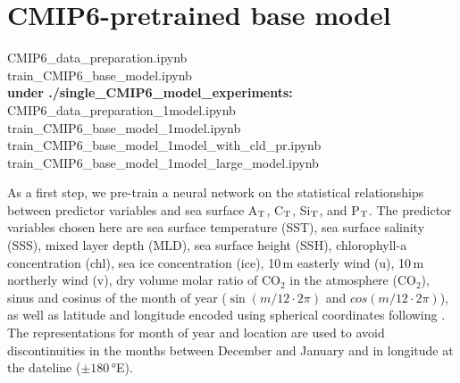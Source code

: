 \documentclass{article}
\begin{document}
	\section{CMIP6-pretrained base model} \label{sect:cmip6-pretraining}
	\begin{tcolorbox}[colback=gray!5!white, colframe=black!75!white, 
		fonttitle=\bfseries, title=Jupyter Notebooks, 
		rounded corners, width=\textwidth]
		CMIP6\_data\_preparation.ipynb \\
		train\_CMIP6\_base\_model.ipynb \\
		\textbf{under ./single\_CMIP6\_model\_experiments:} \\
		CMIP6\_data\_preparation\_1model.ipynb \\
		train\_CMIP6\_base\_model\_1model.ipynb \\
		train\_CMIP6\_base\_model\_1model\_with\_cld\_pr.ipynb \\
		train\_CMIP6\_base\_model\_1model\_large\_model.ipynb
	\end{tcolorbox}
	As a first step, we pre-train a neural network on the statistical relationships between predictor variables and sea surface A$_\textup{T}$, C$_\textup{T}$, Si$_\textup{T}$, and P$_\textup{T}$. The predictor variables chosen here are sea surface temperature (SST), sea surface salinity (SSS), mixed layer depth (MLD), sea surface height (SSH), chlorophyll-a concentration (chl), sea ice concentration (ice), 10\,m easterly wind (u), 10\,m northerly wind (v),
	dry volume molar ratio of CO$_2$ in the atmosphere (CO$_2$), sinus and cosinus of the month of year ($\sin(m / 12 \cdot 2\pi)$ and $cos(m / 12 \cdot 2\pi)$), as well as latitude and longitude encoded using spherical coordinates following \cite{gade2010}. The representations for month of year and location are used to avoid discontinuities in the months between December and January and in longitude at the dateline ($\pm180$\,°E).
	
\end{document}
